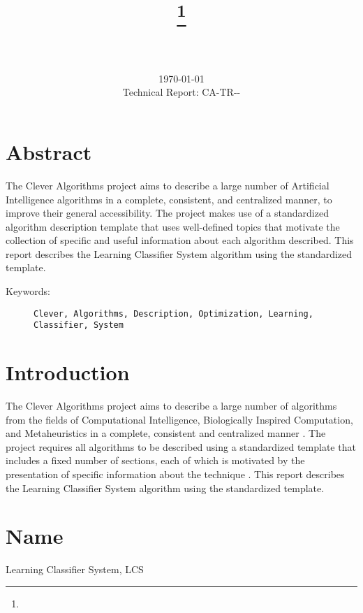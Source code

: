 \documentclass[a4paper, 11pt]{article}
\title{{\myreporttitle}\footnote{\myreportlicense}}
\author{\myreportauthor\\{\myreportemail}\\\small\myreportproject}
\date{\today\\{\small{Technical Report: CA-TR-{\myreportdate}-\myreportversion}}}
\begin{document}
\maketitle

\section*{Abstract} 
The Clever Algorithms project aims to describe a large number of Artificial Intelligence algorithms in a complete, consistent, and centralized manner, to improve their general accessibility. 
The project makes use of a standardized algorithm description template that uses well-defined topics that motivate the collection of specific and useful information about each algorithm described.
This report describes the Learning Classifier System algorithm using the standardized template.

\begin{description}
	\item[Keywords:] {\small\texttt{Clever, Algorithms, Description, Optimization, Learning, Classifier, System}}
\end{description} 

\section{Introduction} 
\label{sec:intro}
The Clever Algorithms project aims to describe a large number of algorithms from the fields of Computational Intelligence, Biologically Inspired Computation, and Metaheuristics in a complete, consistent and centralized manner \cite{Brownlee2010}.
The project requires all algorithms to be described using a standardized template that includes a fixed number of sections, each of which is motivated by the presentation of specific information about the technique \cite{Brownlee2010a}.
This report describes the Learning Classifier System algorithm using the standardized template.

\section{Name} 
\label{sec:name}
Learning Classifier System, LCS
\end{document}
